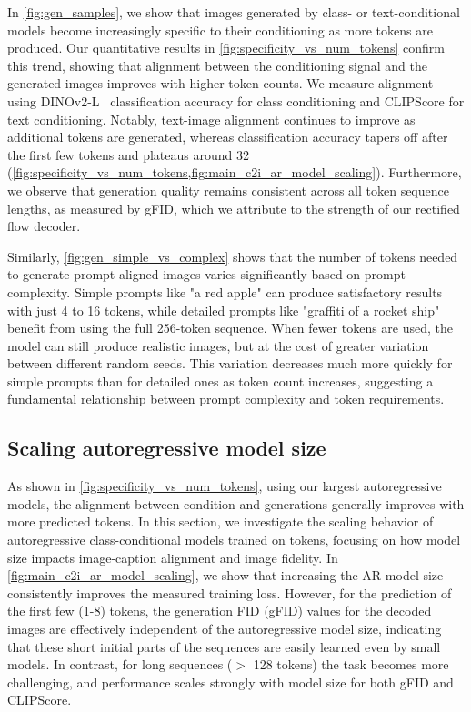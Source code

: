 In \cref{fig:gen_samples}, we show that images generated by class- or text-conditional models become increasingly specific to their conditioning as more tokens are produced. Our quantitative results in \cref{fig:specificity_vs_num_tokens} confirm this trend, showing that alignment between the conditioning signal and the generated images improves  with higher token counts. We measure alignment using DINOv2-L~\cite{Oquab2023DINOv2} classification accuracy for class conditioning and CLIPScore for text conditioning. Notably, text-image alignment continues to improve as additional tokens are generated, whereas classification accuracy tapers off after the first few tokens and plateaus around 32 (\cref{fig:specificity_vs_num_tokens,fig:main_c2i_ar_model_scaling}). Furthermore, we observe that generation quality remains consistent across all token sequence lengths, as measured by gFID, which we attribute to the strength of our rectified flow decoder.

Similarly, \cref{fig:gen_simple_vs_complex} shows that the number of tokens needed to generate prompt-aligned images varies significantly based on prompt complexity. Simple prompts like "a red apple" can produce satisfactory results with just 4 to 16 tokens, while detailed prompts like "graffiti of a rocket ship" benefit from using the full 256-token sequence. When fewer tokens are used, the model can still produce realistic images, but at the cost of greater variation between different random seeds. This variation decreases much more quickly for simple prompts than for detailed ones as token count increases, suggesting a fundamental relationship between prompt complexity and token requirements.

\subsection{Scaling autoregressive model size}
\label{sec:scaling_ar}

As shown in \cref{fig:specificity_vs_num_tokens}, using our largest autoregressive models, the alignment between condition and generations generally improves with more predicted tokens. In this section, we investigate the scaling behavior of autoregressive class-conditional models trained on \oursxlarge tokens, focusing on how model size impacts image-caption alignment and image fidelity. In \cref{fig:main_c2i_ar_model_scaling}, we show that increasing the AR model size consistently improves the measured training loss. However, for the prediction of the first few (1-8) tokens, the generation FID (gFID) values for the decoded images are effectively independent of the autoregressive model size, indicating that these short initial parts of the sequences are easily learned even by small models. In contrast, for long sequences ($>$ 128 tokens) the task becomes more challenging, and performance scales strongly with model size for both gFID and CLIPScore. 

